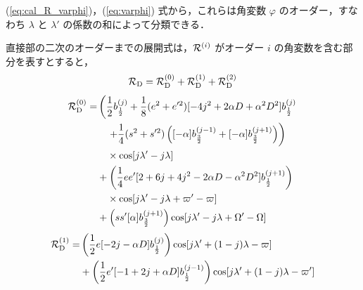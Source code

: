 \documentclass[11pt,a4paper,oneside,onecolumn]{jreport}
\begin{document}
(\ref{eq:cal_R_varphi})，(\ref{eq:varphi}) 式から，これらは角変数 $\varphi$ のオーダー，すなわち $\lambda$ と $\lambda'$ の係数の和によって分類できる．

直接部の二次のオーダーまでの展開式は，${\cal R}^{(i)}$ がオーダー $i$ の角変数を含む部分を表すとすると，
\begin{equation}
{\cal R}_{\rm D} =  {\cal R}_{\rm D}^{(0)} + {\cal R}_{\rm D}^{(1)} + {\cal R}_{\rm D}^{(2)} \label{eq:cal_RD(012)}
\end{equation}
\begin{equation}
\begin{split}
{\cal R}_{\rm D}^{(0)} = & \left( \frac{1}{2} b_{ \frac{1}{2} }^{(j)} + \frac{1}{8} (e^2 + e'^2) [ -4 j^2 + 2 \alpha D + \alpha^2 D^2 ] b_{ \frac{1}{2} }^{(j)} \right. \\
& \left. \quad + \frac{1}{4} (s^2 + s'^2) \left( [- \alpha ] b_{ \frac{3}{2} }^{(j - 1)} + [- \alpha ] b_{ \frac{3}{2} }^{(j + 1)} \right) \right) \\
& \quad \times \cos [j \lambda' - j \lambda ] \\
& + \left( \frac{1}{4} e e' [ 2 + 6j + 4 j^2 - 2 \alpha D - \alpha^2 D^2] b_{ \frac{1}{2} }^{(j + 1)} \right) \\
& \quad \times \cos [j \lambda' - j \lambda + \varpi' - \varpi ] \\
& + \left( s s' [ \alpha ] b_{ \frac{3}{2} }^{(j + 1)} \right) \cos [ j \lambda' - j \lambda + \Omega' - \Omega ]
\end{split} \label{eq:cal_RD(0)}
\end{equation}
\begin{equation}
\begin{split}
{\cal R}_{\rm D}^{(1)} = & \left( \frac{1}{2} e [-2 j - \alpha D] b_{ \frac{1}{2} }^{(j)} \right) \cos [j \lambda' + (1 -j) \lambda - \varpi ] \\
& + \left( \frac{1}{2} e' [ -1 + 2 j + \alpha D] b_{ \frac{1}{2} }^{(j - 1)} \right) \cos [j \lambda' + (1 -j) \lambda - \varpi' ]
\end{split}  \label{eq:cal_RD(1)}
\end{equation}
\end{document}
